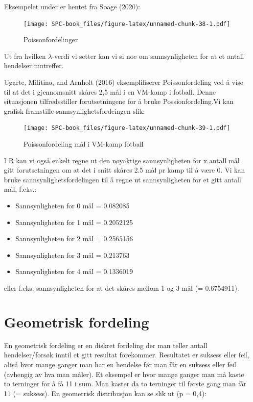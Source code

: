 \documentclass[
]{book}
\providecommand{\tightlist}{%
  \setlength{\itemsep}{0pt}\setlength{\parskip}{0pt}}
\begin{document}
Eksempelet under er hentet fra Soage (2020):

\begin{figure}
\centering
\texttt{[image: SPC-book\_files/figure-latex/unnamed-chunk-38-1.pdf]}
\caption{\label{fig:unnamed-chunk-38}Poissonfordelinger}
\end{figure}

Ut fra hvilken \(\lambda\)-verdi vi setter kan vi si noe om sannsynligheten for at et antall hendelser inntreffer.

Ugarte, Militino, and Arnholt (2016) eksemplifiserer Poissonfordeling ved å vise til at det i gjennomsnitt skåres 2,5 mål i en VM-kamp i fotball. Denne situasjonen tilfredsstiller forutsetningene for å bruke Possionfordeling.Vi kan grafisk framstille sannsynlighetsfordeingen slik:

\begin{figure}
\centering
\texttt{[image: SPC-book\_files/figure-latex/unnamed-chunk-39-1.pdf]}
\caption{\label{fig:unnamed-chunk-39}Poissonfordeling mål i VM-kamp fotball}
\end{figure}

I R kan vi også enkelt regne ut den nøyaktige sannsynligheten for x antall mål gitt forutsetningen om at det i snitt skåres 2.5 mål pr kamp til å være 0. Vi kan bruke sannsynlighetsfordelingen til å regne ut sannsynligheten for et gitt antall mål, f.eks.:

\begin{itemize}
\tightlist
\item
  Sannsynligheten for 0 mål = 0.082085
\item
  Sannsynligheten for 1 mål = 0.2052125
\item
  Sannsynligheten for 2 mål = 0.2565156
\item
  Sannsynligheten for 3 mål = 0.213763
\item
  Sannsynligheten for 4 mål = 0.1336019
\end{itemize}

eller f.eks. sannsynligheten for at det skåres mellom 1 og 3 mål (= 0.6754911).

\hypertarget{geometrisk-fordeling}{%
\section{Geometrisk fordeling}\label{geometrisk-fordeling}}

En geometrisk fordeling er en diskret fordeling der man teller antall hendelser/forsøk inntil et gitt resultat forekommer. Resultatet er suksess eller feil, altså hvor mange ganger man har en hendelse før man får en suksess eller feil (avhengig av hva man måler). Et eksempel er hvor mange ganger man må kaste to terninger for å få 11 i sum. Man kaster da to terninger til første gang man får 11 (= suksess). En geometrisk distribusjon kan se slik ut (p = 0,4):
\end{document}
